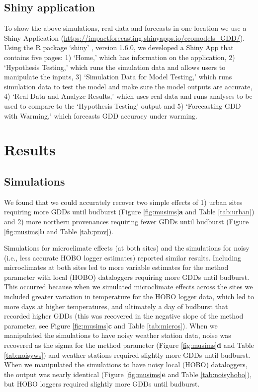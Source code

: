 \documentclass{article}\usepackage[]{graphicx}\usepackage[]{color}
\begin{document}
\subsection*{Shiny application}
To show the above simulations, real data and forecasts in one location we use a Shiny Application (\url{https://impactforecasting.shinyapps.io/ecomodels_GDD/}). Using the R package `shiny' \citep{shiny2021}, version 1.6.0, we developed a Shiny App that contains five pages: 1) `Home,' which has information on the application, 2) `Hypothesis Testing,' which runs the simulation data and allows users to manipulate the inputs, 3) `Simulation Data for Model Testing,' which runs simulation data to test the model and make sure the model outputs are accurate, 4) `Real Data and Analyze Results,' which uses real data and runs analyses to be used to compare to the `Hypothesis Testing' output and 5) `Forecasting GDD with Warming,' which forecasts GDD accuracy under warming. 

\section{Results}
\subsection{Simulations}
We found that we could accurately recover two simple effects of 1) urban sites requiring more GDDs until budburst (Figure \ref{fig:musims}\textbf{a} and Table \ref{tab:urban}) and 2) more northern provenances requiring fewer GDDs until budburst (Figure \ref{fig:musims}\textbf{b} and Table \ref{tab:prov}). 

Simulations for microclimate effects (at both sites) and the simulations for noisy (i.e., less accurate HOBO logger estimates) reported similar results.  Including microclimates at both sites led to more variable estimates for the method parameter with local (HOBO) dataloggers requiring more GDDs until budburst. This occurred because when we simulated microclimate effects across the sites we included greater variation in temperature for the HOBO logger data, which led to more days at higher temperatures, and ultimately a day of budburst that recorded higher GDDs (this was recovered in the negative slope of the method parameter, see Figure \ref{fig:musims}\textbf{c} and Table \ref{tab:micros}). When we manipulated the simulations to have noisy weather station data, noise was recovered as the sigma for the method parameter (Figure \ref{fig:musims}\textbf{d} and Table \ref{tab:noisyws}) and weather stations required slightly more GDDs until budburst. When we manipulated the simulations to have noisy local (HOBO) dataloggers, the output was nearly identical (Figure \ref{fig:musims}\textbf{e} and Table \ref{tab:noisyhobo}), but HOBO loggers required slightly more GDDs until budburst. 
  
\end{document}
